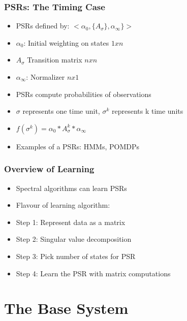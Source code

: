 \documentclass{beamer}
\begin{document}

\begin{frame}
\frametitle{PSRs: The Timing Case}

\begin{itemize}
\item PSRs defined by: $<\alpha_0, \{A_\sigma\},\alpha_\infty\}>$
\item[] $\alpha_0$: Initial weighting on states $1xn$
\item[] $A_\sigma$ Transition matrix $nxn$
\item[] $\alpha_\infty$: Normalizer $nx1$

\item PSRs compute probabilities of observations
\item[] $\sigma$ represents one time unit, $\sigma^k$ represents k time units
\item[] $f(\sigma^k) = \alpha_0*A_\sigma^k*\alpha_\infty$
\item Examples of a PSRs: HMMs, POMDPs
 
\end{itemize}

\end{frame}


\begin{frame}
\frametitle{Overview of Learning}

\begin{itemize}
\item Spectral algorithms can learn PSRs 
\item Flavour of learning algorithm: 
\item[] Step 1: Represent data as a matrix
\item[] Step 2: Singular value decomposition
\item[] Step 3: Pick number of states for PSR
\item[] Step 4: Learn the PSR with matrix computations
\end{itemize}

\end{frame}

\section{The Base System}
\end{document}
